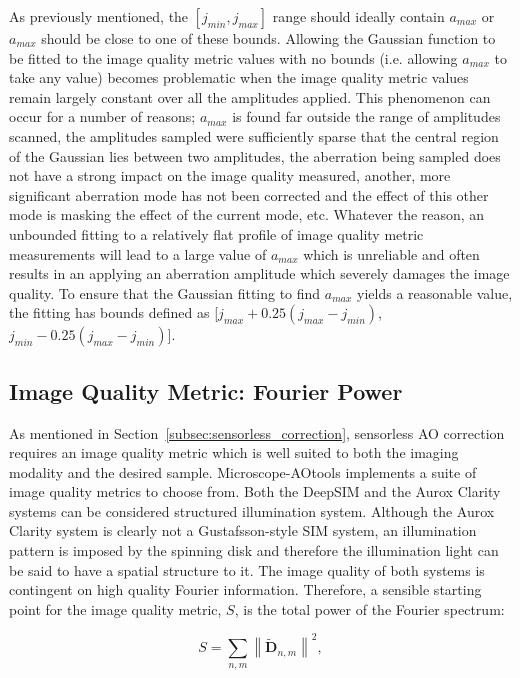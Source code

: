 As previously mentioned, the $[j_{min},j_{max}]$ range should ideally
contain $a_{max}$ or $a_{max}$ should be close to one of these
bounds. Allowing the Gaussian function to be fitted to the image
quality metric values with no bounds (i.e. allowing $a_{max}$ to take
any value) becomes problematic when the image quality metric values
remain largely constant over all the amplitudes applied. This
phenomenon can occur for a number of reasons; $a_{max}$ is found far
outside the range of amplitudes scanned, the amplitudes sampled were
sufficiently sparse that the central region of the Gaussian lies
between two amplitudes, the aberration being sampled does not have a
strong impact on the image quality measured, another, more significant
aberration mode has not been corrected and the effect of this other
mode is masking the effect of the current mode, etc. Whatever the
reason, an unbounded fitting to a relatively flat profile of image
quality metric measurements will lead to a large value of $a_{max}$
which is unreliable and often results in an applying an aberration
amplitude which severely damages the image quality. To ensure that the
Gaussian fitting to find $a_{max}$ yields a reasonable value, the
fitting has bounds defined as [$j_{max} + 0.25(j_{max}-j_{min})$, $j_{min} - 0.25(j_{max}-j_{min})$].

\subsection{Image Quality Metric: Fourier Power}
\label{subsec:fourier_power_metric}


As mentioned in Section~\ref{subsec:sensorless_correction}, sensorless AO 
correction requires an image quality metric which is well suited to both the 
imaging modality and the desired sample. Microscope-AOtools implements a 
suite of image quality metrics to choose from. Both the DeepSIM and the Aurox 
Clarity systems can be considered structured illumination system. Although 
the Aurox Clarity system is clearly not a Gustafsson-style SIM system, an 
illumination pattern is imposed by the spinning disk and therefore the 
illumination light can be said to have a spatial structure to it. The image 
quality of both systems is contingent on high quality Fourier information. 
Therefore, a sensible starting point for the image quality metric, $S$, is 
the total power of the Fourier spectrum:

\begin{equation}\label{eq:fourier_power_spectrum}
S = \sum\limits_{n,m}{\left\| \tilde{\textbf{D}}_{n,m} \right\|^2},
\end{equation}

